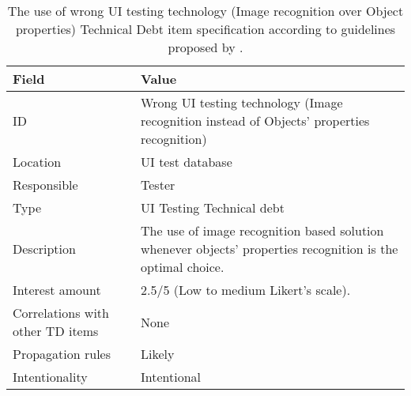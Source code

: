         \begin{table}[!htbp]
		\centering
		\tabulinesep=1.2mm
		\begin{tabu} to \textwidth {|X|X[3]|}
			
			\hline
			\textbf{Field} & \textbf{Value} \\ 
			\hline
			
			ID & Wrong UI testing technology (Image recognition instead of Objects' properties recognition)\\
			\hline
			
			Location & UI test database \\
			\hline
			
			Responsible & Tester \\
			\hline
			
			Type & UI Testing Technical debt \\
			\hline	
			
			Description & The use of image recognition based solution whenever objects' properties recognition is the optimal choice.\\
			\hline
			
			
			
			Interest amount &  2.5/5 (Low to medium Likert's scale). \\
			\hline
			
			
			
			Correlations with other TD items & None\\
			\hline 	 
			
			
			
			Propagation rules & Likely\\
			\hline
			
			Intentionality & Intentional \\
			\hline 	 	
			
		\end{tabu}
		\caption[Use of wrong UI testing technology - Image recognition over Objects' properties - TD item specification]{The use of wrong UI testing technology (Image recognition over Object properties) Technical Debt item specification according to guidelines proposed by \cite{mapping_study_td}.}
		\label{tab:res-image-vs-property}
	\end{table}
	
